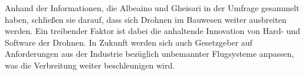 
Anhand der Informationen, die Albeaino und Gheisari in der Umfrage gesammelt haben, schließen sie darauf, dass sich Drohnen im Bauwesen weiter ausbreiten werden.
Ein treibender Faktor ist dabei die anhaltende Innovation von Hard- und Software der Drohnen.
In Zukunft werden sich auch Gesetzgeber auf Anforderungen aus der Industrie bezüglich unbemannter Flugsysteme anpassen, was die Verbreitung weiter beschleunigen wird. \cite[S. 104--105]{abaeano2021trends}


